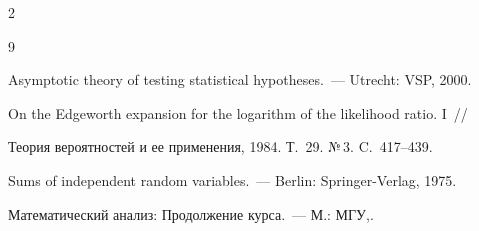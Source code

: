 \begin{multicols}{2}
{{\begin{thebibliography}{9}


 Asymptotic theory of testing statistical hypotheses.~--- Utrecht: VSP, 2000.







 On the Edgeworth expansion for the logarithm of the likelihood ratio. I~// 


Теория вероятностей и ее применения, 1984. Т.~29. №\,3. C.~417--439.













 Sums of independent random variables.~--- Berlin: Springer-Verlag, 1975.





\label{end\stat}







 Математический анализ: Продолжение курса.~--- М.: МГУ,.


 \end{thebibliography}


 }}\end{multicols}


